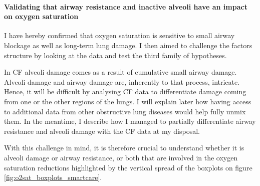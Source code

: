 \paragraph{Validating that airway resistance and inactive alveoli have an impact on oxygen saturation}
I have hereby confirmed that oxygen saturation is sensitive to small airway blockage as well as long-term lung damage. I then aimed to challenge the factors structure by looking at the data and test the third family of hypotheses. 


In CF alveoli damage comes as a result of cumulative small airway damage. Alveoli damage and airway damage are, inherently to that process, intricate. Hence, it will be difficult by analysing CF data to differentiate damage coming from one or the other regions of the lungs. I will explain later how having access to additional data from other obstructive lung diseases would help fully unmix them. In the meantime, I describe how I managed to partially differentiate airway resistance and alveoli damage with the CF data at my disposal. 

With this challenge in mind, it is therefore crucial to understand whether it is alveoli damage or airway resistance, or both that are involved in the oxygen saturation reductions highlighted by the vertical spread of the boxplots on figure \ref{fig:o2sat_boxplots_smartcare}. 



